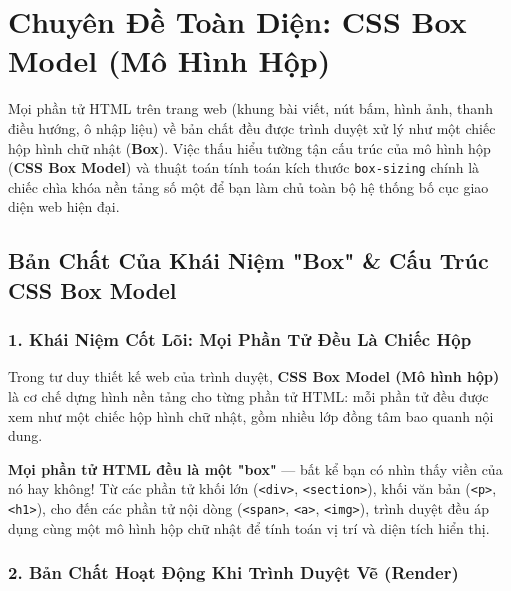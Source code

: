 \documentclass[11pt,oneside]{book}
\newcommand{\codeinline}[1]{\textcolor{accentOrange}{\texttt{#1}}}
\newcommand{\term}[1]{\textbf{\textcolor{primaryBlue}{#1}}}
\begin{document}
\chapter{Chuyên Đề Toàn Diện: CSS Box Model (Mô Hình Hộp)}
\label{chap:box_model_masterclass}

\begin{conceptBox}
Mọi phần tử HTML trên trang web (khung bài viết, nút bấm, hình ảnh, thanh điều hướng, ô nhập liệu) về bản chất đều được trình duyệt xử lý như một chiếc hộp hình chữ nhật (\term{Box}). Việc thấu hiểu tường tận cấu trúc của mô hình hộp (\term{CSS Box Model}) và thuật toán tính toán kích thước \codeinline{box-sizing} chính là chiếc chìa khóa nền tảng số một để bạn làm chủ toàn bộ hệ thống bố cục giao diện web hiện đại.
\end{conceptBox}

\section{Bản Chất Của Khái Niệm "Box" \& Cấu Trúc CSS Box Model}
\label{sec:css_box_model_concept}

\subsection{1. Khái Niệm Cốt Lõi: Mọi Phần Tử Đều Là Chiếc Hộp}

Trong tư duy thiết kế web của trình duyệt, \textbf{CSS Box Model (Mô hình hộp)} là cơ chế dựng hình nền tảng cho từng phần tử HTML: mỗi phần tử đều được xem như một chiếc hộp hình chữ nhật, gồm nhiều lớp đồng tâm bao quanh nội dung.

\begin{noteBox}
\textbf{Mọi phần tử HTML đều là một "box"} — bất kể bạn có nhìn thấy viền của nó hay không! Từ các phần tử khối lớn (\codeinline{<div>}, \codeinline{<section>}), khối văn bản (\codeinline{<p>}, \codeinline{<h1>}), cho đến các phần tử nội dòng (\codeinline{<span>}, \codeinline{<a>}, \codeinline{<img>}), trình duyệt đều áp dụng cùng một mô hình hộp chữ nhật để tính toán vị trí và diện tích hiển thị.
\end{noteBox}

\subsection{2. Bản Chất Hoạt Động Khi Trình Duyệt Vẽ (Render)}
\end{document}
